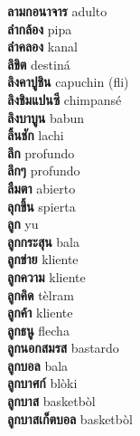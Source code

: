 \textbf{ ลามกอนาจาร  } adulto \\
\textbf{ ลำกล้อง  } pipa \\
\textbf{ ลำคลอง  } kanal \\
\textbf{ ลิขิต  } destiná \\
\textbf{ ลิงคาปูชิน  } capuchin (fli) \\
\textbf{ ลิงชิมแปนซี  } chimpansé \\
\textbf{ ลิงบาบูน  } babun \\
\textbf{ ลิ้นชัก  } lachi \\
\textbf{ ลึก  } profundo \\
\textbf{ ลึกๆ  } profundo \\
\textbf{ ลืมตา  } abierto \\
\textbf{ ลุกขึ้น  } spierta \\
\textbf{ ลูก  } yu \\
\textbf{ ลูกกระสุน  } bala \\
\textbf{ ลูกข่าย  } kliente \\
\textbf{ ลูกความ  } kliente \\
\textbf{ ลูกคิด  } tèlram \\
\textbf{ ลูกค้า  } kliente \\
\textbf{ ลูกธนู  } flecha \\
\textbf{ ลูกนอกสมรส  } bastardo \\
\textbf{ ลูกบอล  } bala \\
\textbf{ ลูกบาศก์  } blòki \\
\textbf{ ลูกบาส  } basketbòl \\
\textbf{ ลูกบาสเก็ตบอล  } basketbòl \\
